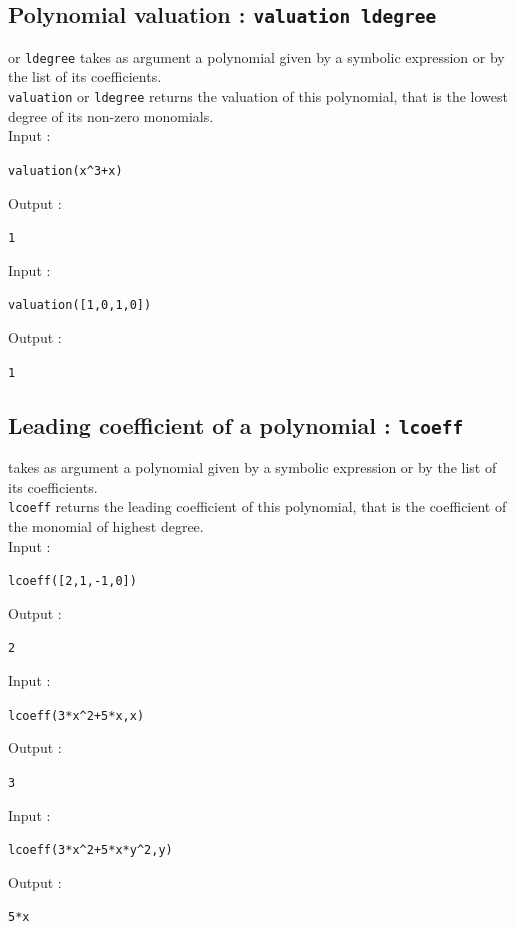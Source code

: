\documentclass[a4paper,11pt]{book}
\begin{document}
\subsection{Polynomial valuation : {\tt valuation ldegree}}
 or {\tt ldegree} takes as argument a polynomial given 
by a symbolic expression or by the list of its coefficients.\\
{\tt valuation} or {\tt ldegree} returns the valuation of this 
polynomial, that is the lowest degree of its non-zero monomials.\\
Input :
\begin{center}{\tt valuation(x\verb|^|3+x)}\end{center}
Output :
\begin{center}{\tt 1}\end{center} 
Input :
\begin{center}{\tt valuation([1,0,1,0])}\end{center}
Output :
\begin{center}{\tt 1}\end{center}

\subsection{Leading coefficient of a polynomial : {\tt lcoeff}}
  takes as argument a polynomial given by a
symbolic expression or by the list of its coefficients.\\
{\tt lcoeff} returns the leading coefficient of this polynomial,
that is the coefficient of the monomial of highest degree.\\
Input :
\begin{center}{\tt lcoeff([2,1,-1,0])}\end{center}
Output :
\begin{center}{\tt  2}\end{center}
Input :
\begin{center}{\tt lcoeff(3*x\verb|^|2+5*x,x)}\end{center}
Output :
\begin{center}{\tt  3}\end{center}
Input :
\begin{center}{\tt lcoeff(3*x\verb|^|2+5*x*y\verb|^|2,y)}\end{center}
Output :
\begin{center}{\tt  5*x}\end{center}
\end{document}
